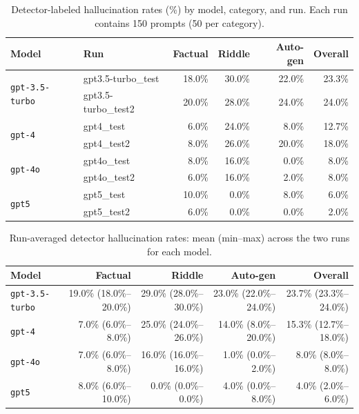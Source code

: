 \documentclass[11pt]{article}
\newcommand{\model}[1]{\texttt{#1}}
\begin{document}
\begin{table}[t]
\centering
\caption{Detector-labeled hallucination rates (\%) by model, category, and run. Each run contains 150 prompts (50 per category).}
\label{tab:rates-by-run}
\begin{tabular}{llrrrr}
\toprule
\textbf{Model} & \textbf{Run} & \textbf{Factual} & \textbf{Riddle} & \textbf{Auto-gen} & \textbf{Overall} \\
\midrule
\multirow{2}{*}{\model{gpt-3.5-turbo}} & gpt3.5-turbo\_test & 18.0\% & 30.0\% & 22.0\% & 23.3\% \\
 & gpt3.5-turbo\_test2 & 20.0\% & 28.0\% & 24.0\% & 24.0\% \\
\multirow{2}{*}{\model{gpt-4}} & gpt4\_test & 6.0\% & 24.0\% & 8.0\% & 12.7\% \\
 & gpt4\_test2 & 8.0\% & 26.0\% & 20.0\% & 18.0\% \\
\multirow{2}{*}{\model{gpt-4o}} & gpt4o\_test & 8.0\% & 16.0\% & 0.0\% & 8.0\% \\
 & gpt4o\_test2 & 6.0\% & 16.0\% & 2.0\% & 8.0\% \\
\multirow{2}{*}{\model{gpt5}} & gpt5\_test & 10.0\% & 0.0\% & 8.0\% & 6.0\% \\
 & gpt5\_test2 & 6.0\% & 0.0\% & 0.0\% & 2.0\% \\
\bottomrule
\end{tabular}
\end{table}

\begin{table}[t]
\centering
\caption{Run-averaged detector hallucination rates: mean (min--max) across the two runs for each model.}
\label{tab:rates-avg}
\begin{tabular}{lrrrr}
\toprule
\textbf{Model} & \textbf{Factual} & \textbf{Riddle} & \textbf{Auto-gen} & \textbf{Overall} \\
\midrule
\model{gpt-3.5-turbo} & 19.0\% (18.0\%--20.0\%) & 29.0\% (28.0\%--30.0\%) & 23.0\% (22.0\%--24.0\%) & 23.7\% (23.3\%--24.0\%) \\
\model{gpt-4} & 7.0\% (6.0\%--8.0\%) & 25.0\% (24.0\%--26.0\%) & 14.0\% (8.0\%--20.0\%) & 15.3\% (12.7\%--18.0\%) \\
\model{gpt-4o} & 7.0\% (6.0\%--8.0\%) & 16.0\% (16.0\%--16.0\%) & 1.0\% (0.0\%--2.0\%) & 8.0\% (8.0\%--8.0\%) \\
\model{gpt5} & 8.0\% (6.0\%--10.0\%) & 0.0\% (0.0\%--0.0\%) & 4.0\% (0.0\%--8.0\%) & 4.0\% (2.0\%--6.0\%) \\
\bottomrule
\end{tabular}
\end{table}
\end{document}
